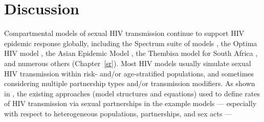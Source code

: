 \section{Discussion}\label{foi.disc} 
Compartmental models of sexual HIV transmission continue to support HIV epidemic response globally, %
including the Spectrum suite of models \cite{Stover2021,Spectrum2022},
the Optima HIV model \cite{Kerr2015,Optima2021},
the Asian Epidemic Model \cite{Brown2004},
the Thembisa model for South Africa \cite{Johnson2016cc,Johnson2022},
and numerous others (\eg Chapter~\ref{sr}).
Most HIV models usually simulate sexual HIV transmission within risk- and/or age-stratified populations, %
and sometimes considering multiple partnership types and/or transmission modifiers. %
As shown in ,
the existing approaches (model structures and equations)
used to define rates of HIV transmission via sexual partnerships in the example models %
--- especially with respect to heterogeneous populations, partnerships, and sex acts ---

